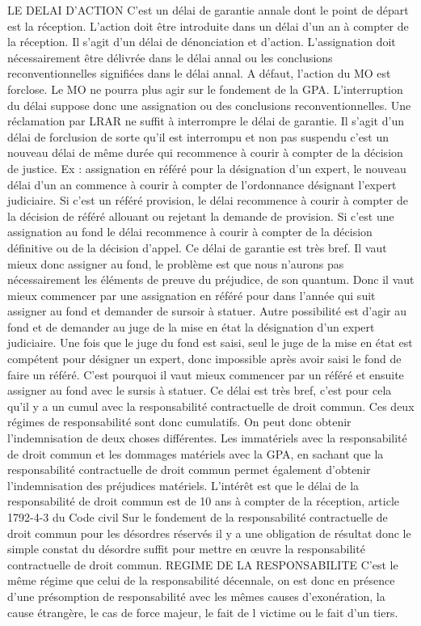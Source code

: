 				LE DELAI D’ACTION
				C’est un délai de garantie annale dont le point de départ est la réception. L’action doit être introduite dans un délai d’un an à compter de la réception.
				Il s’agit d’un délai de dénonciation et d’action. L’assignation doit nécessairement être délivrée dans le délai annal ou les conclusions reconventionnelles signifiées dans le délai annal.
				A défaut, l’action du MO est forclose. Le MO ne pourra plus agir sur le fondement de la GPA. L’interruption du délai suppose donc une assignation ou des conclusions reconventionnelles. Une réclamation par LRAR ne suffit à interrompre le délai de garantie.
				Il s’agit d’un délai de forclusion de sorte qu’il est interrompu et non pas suspendu c’est un nouveau délai de même durée qui recommence à courir à compter de la décision de justice.
				Ex : assignation en référé pour la désignation d’un expert, le nouveau délai d’un an commence à courir à compter de l’ordonnance désignant l’expert judiciaire. Si c’est un référé provision, le délai recommence à courir à compter de la décision de référé allouant ou rejetant la demande de provision. Si c’est une assignation au fond le délai recommence à courir à compter de la décision définitive ou de la décision d’appel.
				Ce délai de garantie est très bref. Il vaut mieux donc assigner au fond, le problème est que nous n’aurons pas nécessairement les éléments de preuve du préjudice, de son quantum. Donc il vaut mieux commencer par une assignation en référé pour dans l’année qui suit assigner au fond et demander de sursoir à statuer. Autre possibilité est d’agir au fond et de demander au juge de la mise en état la désignation d’un expert judiciaire. Une fois que le juge du fond est saisi, seul le juge de la mise en état est compétent pour désigner un expert, donc impossible après avoir saisi le fond de faire un référé. C’est pourquoi il vaut mieux commencer par un référé et ensuite assigner au fond avec le sursis à statuer.
				Ce délai est très bref, c’est pour cela qu’il y a un cumul avec la responsabilité contractuelle de droit commun. Ces deux régimes de responsabilité sont donc cumulatifs. On peut donc obtenir l’indemnisation de deux choses différentes. Les immatériels avec la responsabilité de droit commun et les dommages matériels avec la GPA, en sachant que la responsabilité contractuelle de droit commun permet également d’obtenir l’indemnisation des préjudices matériels. L’intérêt est que le délai de la responsabilité de droit commun est de 10 ans à compter de la réception, article 1792-4-3 du Code civil
				Sur le fondement de la responsabilité contractuelle de droit commun pour les désordres réservés il y a une obligation de résultat donc le simple constat du désordre suffit pour mettre en œuvre la responsabilité contractuelle de droit commun.
				REGIME DE LA RESPONSABILITE
				C’est le même régime que celui de la responsabilité décennale, on est donc en présence d’une présomption de responsabilité avec les mêmes causes d’exonération, la cause étrangère, le cas de force majeur, le fait de l victime ou le fait d’un tiers.



